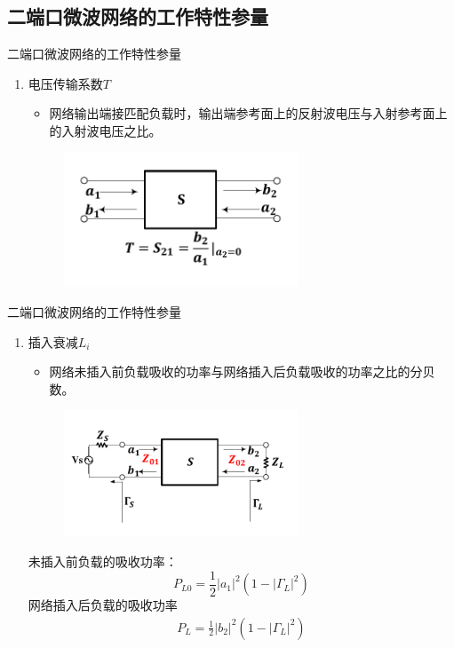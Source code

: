 \subsection{二端口微波网络的工作特性参量}
\begin{frame}{二端口微波网络的工作特性参量}
    \begin{enumerate}
        \item 电压传输系数$T$
              \begin{itemize}
                  \item 网络输出端接匹配负载时，输出端参考面上的反射波电压与入射参考面上的入射波电压之比。
              \end{itemize}
              \begin{figure}
                  \includegraphics[width=7cm]{Cha5//fig5-21.pdf}
              \end{figure}
              \saveenum
    \end{enumerate}
\end{frame}

\begin{frame}{二端口微波网络的工作特性参量}
    \begin{enumerate}
        \resume
        \item 插入衰减$L_i$
              \begin{itemize}
                  \item 网络未插入前负载吸收的功率与网络插入后负载吸收的功率之比的分贝数。
              \end{itemize}
              \begin{figure}
                  \includegraphics[width=7cm]{Cha5//fig5-22.pdf}
              \end{figure}
              未插入前负载的吸收功率：
              $$P_{L0}=\frac{1}{2}\lvert a_1\rvert^2\left(1-\lvert\Gamma_L\rvert^2\right)$$
              网络插入后负载的吸收功率
              \begin{align*}
                  P_L=\frac{1}{2}\lvert b_2\rvert^2\left(1-\lvert\Gamma_L\rvert^2\right)
              \end{align*}
    \end{enumerate}
\end{frame}

